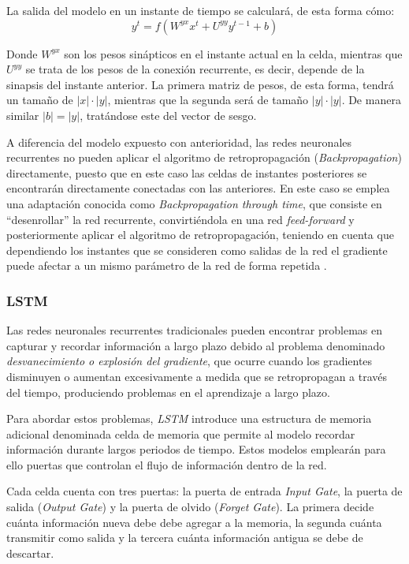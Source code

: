 
La salida del modelo en un instante de tiempo se calculará, de esta forma cómo:
\begin{equation}
    y^t = f(W^{yx}x^t + U^{yy} y^{t-1} + b) 
\end{equation}

Donde \(W^{yx}\) son los pesos sinápticos en el instante actual en la celda, mientras que \(U^{yy}\) se
trata de los pesos de la conexión recurrente, es decir, depende de la sinapsis del instante anterior.
La primera matriz de pesos, de esta forma, tendrá un tamaño de \(|x| \cdot |y|\), mientras que la segunda
será de tamaño \(|y| \cdot  |y|\). De manera similar \(|b| = |y|\), tratándose este del vector de sesgo.

A diferencia del modelo expuesto con anterioridad, las redes neuronales recurrentes no pueden aplicar el algoritmo de retropropagación (\textit{Backpropagation})
directamente, puesto que en este caso las celdas de instantes posteriores se encontrarán directamente conectadas con las anteriores.
En este caso se emplea una adaptación conocida como \textit{Backpropagation through time}, que consiste en ``desenrollar'' la red recurrente, convirtiéndola
en una red \textit{feed-forward} y posteriormente aplicar el algoritmo de retropropagación, teniendo en cuenta que dependiendo los instantes 
que se consideren como salidas de la red el gradiente puede afectar a un mismo parámetro de la red de forma repetida \cite{book:rue2019}.

\subsubsection{LSTM}
Las redes neuronales recurrentes tradicionales pueden encontrar problemas en capturar y recordar información
a largo plazo debido al problema denominado \textit{desvanecimiento o explosión del gradiente}, que ocurre
cuando los gradientes disminuyen o aumentan excesivamente a medida que se retropropagan a través
del tiempo, produciendo problemas en el aprendizaje a largo plazo.

Para abordar estos problemas, \textit{LSTM} introduce una estructura de memoria adicional denominada
celda de memoria que permite al modelo recordar información durante largos periodos de tiempo. Estos 
modelos emplearán para ello puertas que controlan el flujo de información dentro de la red.

Cada celda cuenta con tres puertas: la puerta de entrada \textit{Input Gate}, la puerta de salida 
(\textit{Output Gate}) y la puerta de olvido (\textit{Forget Gate}). La primera decide
cuánta información nueva debe debe agregar a la memoria, la segunda cuánta transmitir como salida y 
la tercera cuánta información antigua se debe de descartar.

